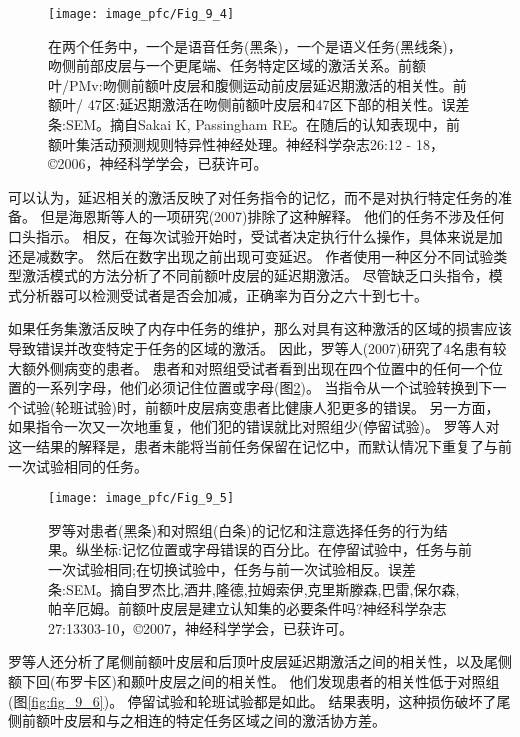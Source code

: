 \begin{figure}[!htb]
	\centering
	\texttt{[image: image\_pfc/Fig\_9\_4]}
	\caption{在两个任务中，一个是语音任务(黑条)，一个是语义任务(黑线条)，吻侧前部皮层与一个更尾端、任务特定区域的激活关系。前额叶/PMv:吻侧前额叶皮层和腹侧运动前皮层延迟期激活的相关性。前额叶/ 47区:延迟期激活在吻侧前额叶皮层和47区下部的相关性。误差条:SEM。摘自Sakai K, Passingham RE。在随后的认知表现中，前额叶集活动预测规则特异性神经处理。神经科学杂志26:12 - 18，©2006，神经科学学会，已获许可。\label{fig:fig_9_4}}
\end{figure}
\par


可以认为，延迟相关的激活反映了对任务指令的记忆，而不是对执行特定任务的准备。
但是海恩斯等人的一项研究(2007)排除了这种解释。
他们的任务不涉及任何口头指示。
相反，在每次试验开始时，受试者决定执行什么操作，具体来说是加还是减数字。
然后在数字出现之前出现可变延迟。
作者使用一种区分不同试验类型激活模式的方法分析了不同前额叶皮层的延迟期激活。
尽管缺乏口头指令，模式分析器可以检测受试者是否会加减，正确率为百分之六十到七十。
\par


如果任务集激活反映了内存中任务的维护，那么对具有这种激活的区域的损害应该导致错误并改变特定于任务的区域的激活。
因此，罗等人(2007)研究了4名患有较大额外侧病变的患者。
患者和对照组受试者看到出现在四个位置中的任何一个位置的一系列字母，他们必须记住位置或字母(图\ref{fig:fig_9_5})。
当指令从一个试验转换到下一个试验(轮班试验)时，前额叶皮层病变患者比健康人犯更多的错误。
另一方面，如果指令一次又一次地重复，他们犯的错误就比对照组少(停留试验)。
罗等人对这一结果的解释是，患者未能将当前任务保留在记忆中，而默认情况下重复了与前一次试验相同的任务。
\par


\begin{figure}[!htb]
	\centering
	\texttt{[image: image\_pfc/Fig\_9\_5]}
	\caption{罗等对患者(黑条)和对照组(白条)的记忆和注意选择任务的行为结果。纵坐标:记忆位置或字母错误的百分比。在停留试验中，任务与前一次试验相同;在切换试验中，任务与前一次试验相反。误差条:SEM。摘自罗杰比,酒井,隆德,拉姆索伊,克里斯滕森,巴雷,保尔森, 帕辛厄姆。前额叶皮层是建立认知集的必要条件吗?神经科学杂志27:13303-10，©2007，神经科学学会，已获许可。\label{fig:fig_9_5}}
\end{figure}

\par


罗等人还分析了尾侧前额叶皮层和后顶叶皮层延迟期激活之间的相关性，以及尾侧额下回(布罗卡区)和颞叶皮层之间的相关性。
他们发现患者的相关性低于对照组(图\ref{fig:fig_9_6})。
停留试验和轮班试验都是如此。
结果表明，这种损伤破坏了尾侧前额叶皮层和与之相连的特定任务区域之间的激活协方差。
\par


